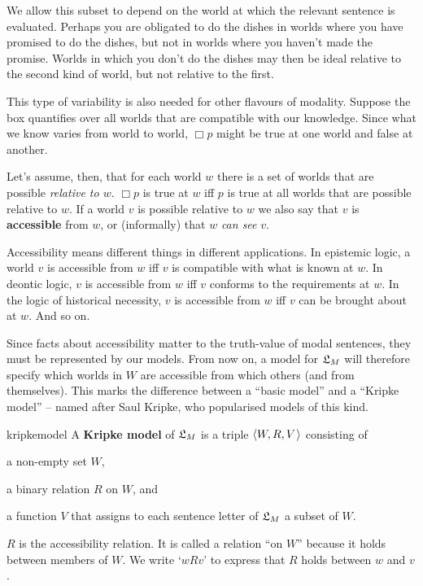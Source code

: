 We allow this subset to depend on the world at which the relevant sentence is evaluated.
Perhaps you are obligated to do the dishes in worlds where you have promised to
do the dishes, but not in worlds where you haven't made the promise. Worlds in
which you don't do the dishes may then be ideal relative to the second kind of
world, but not relative to the first.

This type of variability is also needed for other flavours of modality. Suppose
the box quantifies over all worlds that are compatible with our knowledge. Since
what we know varies from world to world, $\Box p$ might be true at one world and
false at another.


Let's assume, then, that for each world $w$ there is a set of
worlds that are possible \emph{relative to $w$}. $\Box p$ is true at $w$ iff $p$
is true at all worlds that are possible relative to $w$. If a world $v$ is
possible relative to $w$ we also say that $v$ is \textbf{accessible} from $w$,
or (informally) that $w$ \emph{can see} $v$.

Accessibility means different things in different applications. In epistemic
logic, a world $v$ is accessible from $w$ iff $v$ is compatible with what is
known at $w$. In deontic logic, $v$ is accessible from $w$ iff $v$ conforms to
the requirements at $w$. In the logic of historical necessity, $v$ is accessible
from $w$ iff $v$ can be brought about at $w$. And so on.

Since facts about accessibility matter to the truth-value of modal sentences,
they must be represented by our models. From now on, a model for $\mathfrak{L}_M$ will
therefore specify which worlds in $W$ are accessible from which others (and from
themselves). This marks the difference between a ``basic model'' and a ``Kripke
model'' -- named after Saul Kripke, who popularised models of this kind.
%
% 
\begin{definition}{}{kripkemodel}
  A \textbf{Kripke model} of $\mathfrak{L}_M$ is a triple $\t{W,R,V}$ consisting of
  \vspace{-3mm}
  \begin{itemize*}
  \item a non-empty set $W$,
  \item a binary relation $R$ on $W$, and
  \item a function $V$ that assigns to each sentence letter of $\mathfrak{L}_M$
  a subset of $W$.
  \end{itemize*}
\end{definition}
%
\noindent%
$R$ is the accessibility relation. It is called a relation ``on $W$'' because it
holds between members of $W$. We write `$wRv$' to express that $R$ holds between
$w$ and $v$.

